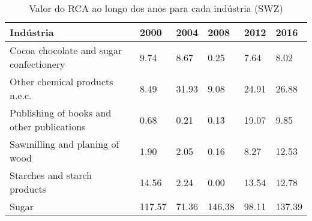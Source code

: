 \begin{table}
\centering
\caption{Valor do RCA ao longo dos anos para cada indústria (SWZ)}
\label{tab:ex3-tempo-SWZ}
\begin{tabular}{p{6cm}p{1.5cm}p{1.5cm}p{1.5cm}p{1.5cm}p{1.5cm}}
\toprule
                                 Indústria &   2000 &  2004 &   2008 &  2012 &   2016 \\
\midrule
   Cocoa chocolate and sugar confectionery &   9.74 &  8.67 &   0.25 &  7.64 &   8.02 \\
            Other chemical products n.e.c. &   8.49 & 31.93 &   9.08 & 24.91 &  26.88 \\
Publishing of books and other publications &   0.68 &  0.21 &   0.13 & 19.07 &   9.85 \\
            Sawmilling and planing of wood &   1.90 &  2.05 &   0.16 &  8.27 &  12.53 \\
              Starches and starch products &  14.56 &  2.24 &   0.00 & 13.54 &  12.78 \\
                                     Sugar & 117.57 & 71.36 & 146.38 & 98.11 & 137.39 \\
\bottomrule
\end{tabular}
\end{table}
